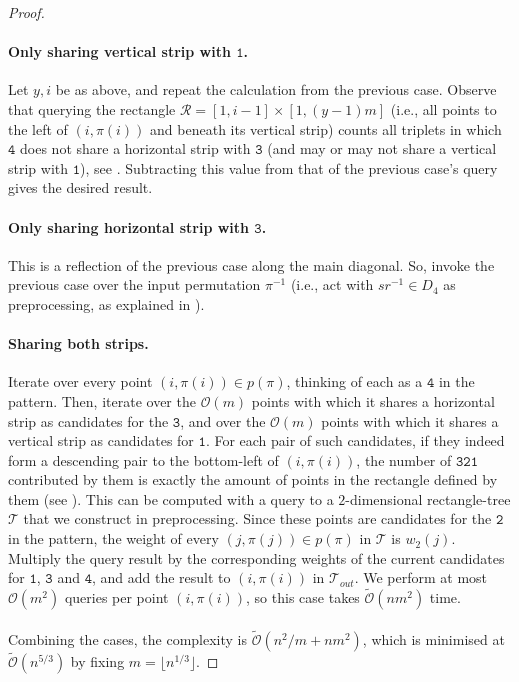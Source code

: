 \documentclass{article}
\theoremstyle{remark}
\newcommand{\Otilde}[1]{\widetilde{\mathcal{O}}\left( #1 \right)}
\newcommand{\Oh}[1]{\mathcal{O}\left( #1 \right)}
\theoremstyle{plain}
\begin{document}
\begin{proof}
\paragraph{Only sharing vertical strip with $\mathbf{\mathtt{1}}$.}
Let $y,i$ be as above, and repeat the calculation from the previous case.
Observe that querying the rectangle $\mathcal{R} = [1,i-1] \times [1,(y-1)m]$ (i.e., all points to the left of $(i, \pi(i))$
and beneath its vertical strip) counts all triplets in which $\mathtt{4}$ does not share a horizontal strip with $\mathtt{3}$
(and may or may not share a vertical strip with $\mathtt{1}$), see .
Subtracting this value from that of the previous case's query gives the desired result.

\paragraph{Only sharing horizontal strip with $\mathbf{\mathtt{3}}$.}
This is a reflection of the previous case along the main diagonal. So, invoke the previous case over the
input permutation $\pi^{-1}$ (i.e., act with $sr^{-1} \in D_4$ as preprocessing, as explained in ).

\paragraph{Sharing both strips.}
Iterate over every point $(i,\pi(i))\in p(\pi)$, thinking of each as a $\mathtt{4}$ in the pattern.
Then, iterate over the $\Oh{m}$ points with which it shares a horizontal strip as candidates for the $\mathtt{3}$,
and over the $\Oh{m}$ points with which it shares a vertical strip as candidates for $\mathtt{1}$.
For each pair of such candidates, if they indeed form a descending pair to the bottom-left of $(i,\pi(i))$,
the number of $\mathtt{321}$ contributed by them is exactly the amount of points in the rectangle defined by them
(see ).
This can be computed with a query to a $2$-dimensional rectangle-tree $\mathcal{T}$ that we construct in preprocessing.
Since these points are candidates for the $\mathtt{2}$ in the pattern,
the weight of every $(j,\pi(j))\in p(\pi)$ in $\mathcal{T}$ is $w_2(j)$.
Multiply the query result by the corresponding weights of the current candidates for $\mathtt{1}$, $\mathtt{3}$ and $\mathtt{4}$, 
and add the result to $(i,\pi(i))$ in $\mathcal{T}_{out}$.
We perform at most $\Oh{m^2}$ queries per point $(i,\pi(i))$, so this case takes $\Otilde{nm^2}$ time.

\paragraph{}
Combining the cases, the complexity is $\Otilde{n^2/m+n m^2}$, which is minimised at $\Otilde{n^{5/3}}$ by fixing $m=\lfloor n^{1/3} \rfloor$.
\end{proof}
\end{document}
